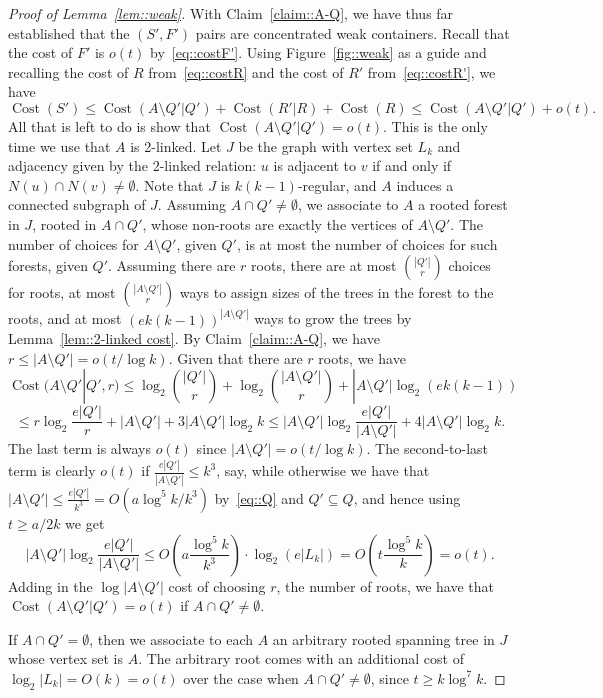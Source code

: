 \documentclass[12pt]{article}
\DeclareMathOperator{\cost}{Cost}
\begin{document}
\begin{proof}[Proof of Lemma~\ref{lem::weak}]
With Claim~\ref{claim::A-Q}, we have thus far established that the $(S',F')$ pairs are concentrated weak containers. Recall that the cost of $F'$ is $o(t)$ by~\eqref{eq::costF'}. Using Figure~\ref{fig::weak} as a guide and recalling the cost of $R$ from~\eqref{eq::costR} and the cost of $R'$ from~\eqref{eq::costR'}, we have
\[ \cost(S') \leq \cost(A \setminus Q' | Q') + \cost(R' | R) + \cost(R) \leq \cost(A \setminus Q' | Q') + o(t) .\]
All that is left to do is show that $\cost(A \setminus Q' | Q') = o(t)$. This is the only time we use that $A$ is 2-linked. Let $J$ be the graph with vertex set $L_k$ and adjacency given by the 2-linked relation: $u$ is adjacent to $v$ if and only if $N(u) \cap N(v) \neq \emptyset$. Note that $J$ is $k(k-1)$-regular, and $A$ induces a connected subgraph of $J$. Assuming $A \cap Q' \neq \emptyset$, we associate to $A$ a rooted forest in $J$, rooted in $A \cap Q'$, whose non-roots are exactly the vertices of $A \setminus Q'$. The number of choices for $A \setminus Q'$, given $Q'$, is at most the number of choices for such forests, given $Q'$. Assuming there are $r$ roots, there are at most $\binom{|Q'|}{r}$ choices for roots, at most $\binom{|A \setminus Q'|}{r}$ ways to assign sizes of the trees in the forest to the roots, and at most $(ek(k-1))^{|A \setminus Q'|}$ ways to grow the trees by Lemma~\ref{lem::2-linked cost}. By Claim~\ref{claim::A-Q}, we have $r \leq |A \setminus Q'| = o(t/\log k)$. Given that there are $r$ roots, we have
\[ \cost(A \setminus Q' | Q', r) \leq \log_2\binom{|Q'|}{r} + \log_2 \binom{|A \setminus Q'|}{r} + |A\setminus Q'| \log_2(ek(k-1)) \]
\[ \leq r \log_2\frac{e|Q'|}{r} + |A \setminus Q'| + 3|A \setminus Q'| \log_2 k \leq |A \setminus Q'| \log_2\frac{e|Q'|}{|A \setminus Q'|} + 4|A \setminus Q'| \log_2 k .\]
The last term is always $o(t)$ since $|A \setminus Q'| = o(t/\log k)$. The second-to-last term is clearly $o(t)$ if $\frac{e|Q'|}{|A \setminus Q'|} \leq k^3$, say, while otherwise we have that $|A \setminus Q'| \leq \frac{e|Q'|}{k^3} = O(a\log^5 k / k^3)$ by~\eqref{eq::Q} and $Q' \subseteq Q$, and hence using $t \geq a/2k$ we get
\[ |A \setminus Q'| \log_2\frac{e|Q'|}{|A \setminus Q'|} \leq O\left( a \frac{\log^5 k}{k^3} \right) \cdot \log_2 (e|L_k|) = O\left( t \frac{\log^5 k}{k} \right) = o(t) .\]
Adding in the $\log|A \setminus Q'|$ cost of choosing $r$, the number of roots, we have that $\cost(A \setminus Q' | Q') = o(t)$ if $A \cap Q' \neq \emptyset$.

If $A \cap Q' = \emptyset$, then we associate to each $A$ an arbitrary rooted spanning tree in $J$ whose vertex set is $A$. The arbitrary root comes with an additional cost of $\log_2 |L_k| = O(k) = o(t)$ over the case when $A \cap Q' \neq \emptyset$, since $t \geq k \log^7 k$.
\end{proof}
\end{document}
